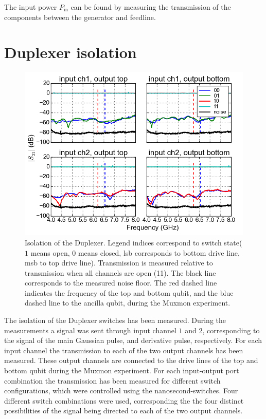   The input power $P_\text{in}$ can be found by measuring the transmission of the components between the generator and feedline.



\chapter{Duplexer isolation}
  \label{ch:Duplexer isolation}

  \begin{figure}[h]
    \centering
    \includegraphics[width=\textwidth]{../Figures/Appendix/Duplexer isolation.png}
    \caption{Isolation of the Duplexer. Legend indices correspond to switch state($1$ means open, $0$ means closed, lsb corresponds to bottom drive line, msb to top drive line). Transmission is measured relative to transmission when all channels are open (11). The black line corresponds to the measured noise floor. The red dashed line indicates the frequency of the top and bottom qubit, and the blue dashed line to the ancilla qubit, during the Muxmon experiment.}
    \label{fig:Duplexer isolation}
  \end{figure}

  The isolation of the Duplexer switches has been measured. During the measurements a signal was sent through input channel $1$ and $2$, corresponding to the signal of the main Gaussian pulse, and derivative pulse, respectively. For each input channel the transmission to each of the two output channels has been measured. These output channels are connected to the drive lines of the top and bottom qubit during the Muxmon experiment. For each input-output port combination the transmission has been measured for different switch configurations, which were controlled using the nanosecond-switches. Four different switch combinations were used, corresponding the the four distinct possibilities of the signal being directed to each of the two output channels.


